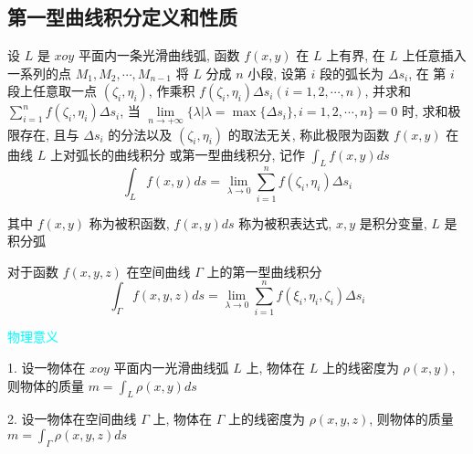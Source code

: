 \subsection{第一型曲线积分定义和性质}

\begin{definition}[第一型曲线积分]
	设 $L$ 是 $xoy$ 平面内一条光滑曲线弧, 函数 $f(x,y)$ 在 $L$ 上有界, 在 $L$ 上任意插入一系列的点 $M_{1}, M_{2}, \cdots, M_{n-1}$ 将 $L$ 分成 $n$ 小段, 设第 $i$ 段的弧长为 $\Delta s_{i}$, 
	在 第 $i$ 段上任意取一点 $(\zeta_{i},\eta_{i})$, 作乘积 $f(\zeta_{i},\eta_{i})\Delta s_{i}(i=1,2,\cdots,n)$, 并求和 $\sum\limits_{i=1}^{n}f(\zeta_{i},\eta_{i})\Delta s_{i}$, 当 
	$\lim\limits_{n \to +\infty}\{\lambda|\lambda = \max\{\Delta s_{i}\}, i =1,2,\cdots,n\} = 0$ 时, 求和极限存在, 
	且与 $\Delta s_{i}$ 的分法以及 $(\zeta_{i},\eta_{i})$ 的取法无关, 称此极限为函数 $f(x,y)$ 在曲线 $L$ 上对弧长的曲线积分
	或第一型曲线积分, 记作 $\int_{L}f(x,y)ds$
	$$\int_{L}f(x,y)ds = \lim\limits_{\lambda \to 0}\sum\limits_{i=1}^{n}f(\zeta_{i},\eta_{i})\Delta s_{i}$$ 

	其中 $f(x,y)$ 称为被积函数, $f(x,y)ds$ 称为被积表达式, $x,y$ 是积分变量, $L$ 是积分弧

	对于函数 $f(x,y,z)$ 在空间曲线 $\Gamma$ 上的第一型曲线积分
	$$\int_{\Gamma}f(x,y,z)ds = \lim\limits_{\lambda \to 0}\sum\limits_{i=1}^{n}f(\xi_{i},\eta_{i},\zeta_{i})\Delta s_{i}$$

	\textcolor{cyan}{物理意义}

	1. 设一物体在 $xoy$ 平面内一光滑曲线弧 $L$ 上, 物体在 $L$ 上的线密度为 $\rho(x,y)$, 则物体的质量 $m = \int_{L}\rho(x,y)ds$

	2. 设一物体在空间曲线 $\Gamma$ 上, 物体在 $\Gamma$ 上的线密度为 $\rho(x,y,z)$, 则物体的质量 $m = \int_{\Gamma}\rho(x,y,z)ds$
\end{definition}
